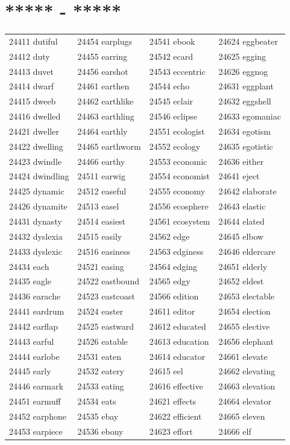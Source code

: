 \documentclass[10pt, oneside]{book}
\begin{document}
\begin{table}
	\centering
	\section*{***** - *****}
	\begin{tabular}{l l l l}
24411 dutiful &24454 earplugs &24541 ebook &24624 eggbeater\\
24412 duty &24455 earring &24542 ecard &24625 egging\\
24413 duvet &24456 earshot &24543 eccentric &24626 eggnog\\
24414 dwarf &24461 earthen &24544 echo &24631 eggplant\\
24415 dweeb &24462 earthlike &24545 eclair &24632 eggshell\\
24416 dwelled &24463 earthling &24546 eclipse &24633 egomaniac\\
24421 dweller &24464 earthly &24551 ecologist &24634 egotism\\
24422 dwelling &24465 earthworm &24552 ecology &24635 egotistic\\
24423 dwindle &24466 earthy &24553 economic &24636 either\\
24424 dwindling &24511 earwig &24554 economist &24641 eject\\
24425 dynamic &24512 easeful &24555 economy &24642 elaborate\\
24426 dynamite &24513 easel &24556 ecosphere &24643 elastic\\
24431 dynasty &24514 easiest &24561 ecosystem &24644 elated\\
24432 dyslexia &24515 easily &24562 edge &24645 elbow\\
24433 dyslexic &24516 easiness &24563 edginess &24646 eldercare\\
24434 each &24521 easing &24564 edging &24651 elderly\\
24435 eagle &24522 eastbound &24565 edgy &24652 eldest\\
24436 earache &24523 eastcoast &24566 edition &24653 electable\\
24441 eardrum &24524 easter &24611 editor &24654 election\\
24442 earflap &24525 eastward &24612 educated &24655 elective\\
24443 earful &24526 eatable &24613 education &24656 elephant\\
24444 earlobe &24531 eaten &24614 educator &24661 elevate\\
24445 early &24532 eatery &24615 eel &24662 elevating\\
24446 earmark &24533 eating &24616 effective &24663 elevation\\
24451 earmuff &24534 eats &24621 effects &24664 elevator\\
24452 earphone &24535 ebay &24622 efficient &24665 eleven\\
24453 earpiece &24536 ebony &24623 effort &24666 elf\\
	\end{tabular}
 \end{table}
\end{document}

